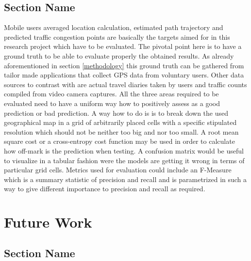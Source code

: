\documentclass[12pt, a4paper]{report}
\theoremstyle{definition}
\theoremstyle{definition}%
\theoremstyle{definition}%
\theoremstyle{definition}%
\theoremstyle{definition}%
\theoremstyle{definition}%
\begin{document}
\section{Section Name}
Mobile users averaged location calculation, estimated path trajectory and predicted traffic congestion points are basically the targets aimed for in this research project which have to be evaluated. The pivotal point here is to have a ground truth to be able to evaluate properly the obtained results. As already aforementioned in section \ref{methodology} this ground truth can be gathered from tailor made applications that collect GPS data from voluntary users. Other data sources to contrast with are actual travel diaries taken by users and traffic counts compiled from video camera captures.
All the three areas required to be evaluated need to have a uniform way how to positively assess as a good prediction or bad prediction. A way how to do is is to break down the used geographical map in a grid of arbitrarily placed cells with a specific stipulated resolution which should not be neither too big and nor too small. A root mean square cost or a cross-entropy cost function may be used in order to calculate how off-mark is the prediction when testing. A confusion matrix would be useful to visualize in a tabular fashion were the models are getting it wrong in terms of particular grid cells. Metrics used for evaluation could include an F-Measure which is a summary statistic of precision and recall and is parametrized in such a way to give different importance to precision and recall as required.

\chapter{Future Work}
\section{Section Name}




\end{document}

